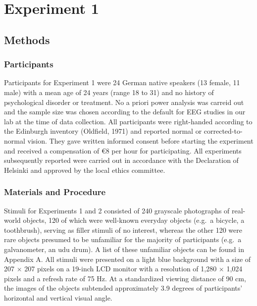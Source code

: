 \documentclass[
  english,
  man,11pt,floatsintext]{apa7}
\begin{document}
\hypertarget{experiment-1}{%
\section{Experiment 1}\label{experiment-1}}

\hypertarget{methods}{%
\subsection{Methods}\label{methods}}

\hypertarget{participants}{%
\subsubsection{Participants}\label{participants}}

Participants for Experiment 1 were 24 German native speakers (13 female, 11 male) with a mean age of 24 years (range 18 to 31) and no history of psychological disorder or treatment. No a priori power analysis was carreid out and the sample size was chosen according to the default for EEG studies in our lab at the time of data collection. All participants were right-handed according to the Edinburgh inventory (Oldfield, 1971) and reported normal or corrected-to-normal vision. They gave written informed consent before starting the experiment and received a compensation of €8 per hour for participating. All experiments subsequently reported were carried out in accordance with the Declaration of Helsinki and approved by the local ethics committee.

\hypertarget{materials-and-procedure}{%
\subsubsection{Materials and Procedure}\label{materials-and-procedure}}

Stimuli for Experiments 1 and 2 consisted of 240 grayscale photographs of real-world objects, 120 of which were well-known everyday objects (e.g.~a bicycle, a toothbrush), serving as filler stimuli of no interest, whereas the other 120 were rare objects presumed to be unfamiliar for the majority of participants (e.g.~a galvanometer, an udu drum). A list of these unfamiliar objects can be found in Appendix A. All stimuli were presented on a light blue background with a size of 207 × 207 pixels on a 19-inch LCD monitor with a resolution of 1,280 × 1,024 pixels and a refresh rate of 75 Hz. At a standardized viewing distance of 90 cm, the images of the objects subtended approximately 3.9 degrees of participants' horizontal and vertical visual angle.
\end{document}
